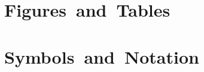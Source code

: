 \documentclass[%
  type=bsc,%
  colorback,%
  bibliography=totoc,%
  bigchapter,%
  twoside,%
  openleft,%
  accentcolor=tud1c%
]{tudthesis}
\author{\StudentName}
\newcommand{\content}{%
  }
\newcommand{\StudentName}{Sebastian Rinder}
\begin{document}
%
  \makethesistitle                          %
  
%
%
%
%
\setcounter{tocdepth}{2}
  \tableofcontents
%
  \chapter*{Figures~and~Tables}
  \begingroup                               %
    \let\clearpage\relax
    \listoffigures\listoftables
  \endgroup
%
  \chapter*{Symbols~and~Notation}
  
%
%
  \content                                  %
%
  \cleardoublepage
  \nocite{*}                                %
%
%
\end{document}
